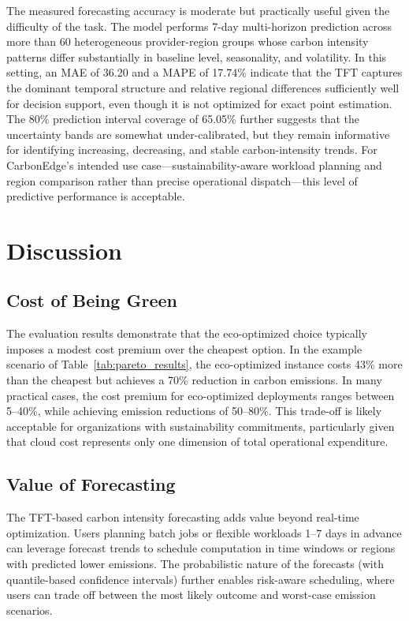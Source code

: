 \documentclass[conference]{IEEEtran}
\begin{document}
The measured forecasting accuracy is moderate but practically useful given the difficulty of the task. The model performs 7-day multi-horizon prediction across more than 60 heterogeneous provider-region groups whose carbon intensity patterns differ substantially in baseline level, seasonality, and volatility. In this setting, an MAE of 36.20 and a MAPE of 17.74\% indicate that the TFT captures the dominant temporal structure and relative regional differences sufficiently well for decision support, even though it is not optimized for exact point estimation. The 80\% prediction interval coverage of 65.05\% further suggests that the uncertainty bands are somewhat under-calibrated, but they remain informative for identifying increasing, decreasing, and stable carbon-intensity trends. For CarbonEdge's intended use case---sustainability-aware workload planning and region comparison rather than precise operational dispatch---this level of predictive performance is acceptable.


\section{Discussion}

\subsection{Cost of Being Green}

The evaluation results demonstrate that the eco-optimized choice typically imposes a modest cost premium over the cheapest option. In the example scenario of Table~\ref{tab:pareto_results}, the eco-optimized instance costs 43\% more than the cheapest but achieves a 70\% reduction in carbon emissions. In many practical cases, the cost premium for eco-optimized deployments ranges between 5--40\%, while achieving emission reductions of 50--80\%. This trade-off is likely acceptable for organizations with sustainability commitments, particularly given that cloud cost represents only one dimension of total operational expenditure.

\subsection{Value of Forecasting}

The TFT-based carbon intensity forecasting adds value beyond real-time optimization. Users planning batch jobs or flexible workloads 1--7 days in advance can leverage forecast trends to schedule computation in time windows or regions with predicted lower emissions. The probabilistic nature of the forecasts (with quantile-based confidence intervals) further enables risk-aware scheduling, where users can trade off between the most likely outcome and worst-case emission scenarios.
\end{document}
